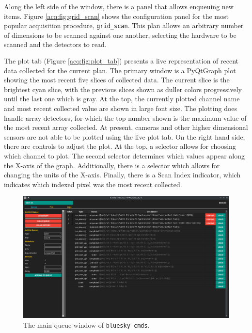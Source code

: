 \documentclass[11pt, full]{article}
\begin{document}
Along the left side of the window, there is a panel that allows enqueuing new items.
Figure \ref{acq:fig:grid_scan} shows the configuration panel for the most popular acquisition procedure, \texttt{grid\_scan}.
This plan allows an arbitrary number of dimensions to be scanned against one another, selecting the hardware to be scanned and the detectors to read.

The plot tab (Figure \ref{acq:fig:plot_tab}) presents a live representation of recent data collected for the current plan.
The primary window is a PyQtGraph\cite{pyqtgraph} plot showing the most recent five slices of collected data.
The current slice is the brightest cyan slice, with the previous slices shown as duller colors progressively until the last one which is gray.
At the top, the currently plotted channel name and most recent collected value are shown in large font size.
The plotting does handle array detectors, for which the top number shown is the maximum value of the most recent array collected.
At present, cameras and other higher dimensional sensors are not able to be plotted using the live plot tab.
On the right hand side, there are controls to adjust the plot.
At the top, a selector allows for choosing which channel to plot.
The second selector determines which values appear along the X-axis of the graph.
Additionally, there is a selector which allows for changing the units of the X-axis.
Finally, there is a Scan Index indicator, which indicates which indexed pixel was the most recent collected.

\clearpage

\begin{landscape}
\begin{figure}
\includegraphics[width=9in]{"figures/queue_tab.png"}
	\caption{The main queue window of \texttt{bluesky-cmds}.}
\label{acq:fig:queue_tab}
\end{figure}
\end{landscape}
\end{document}
